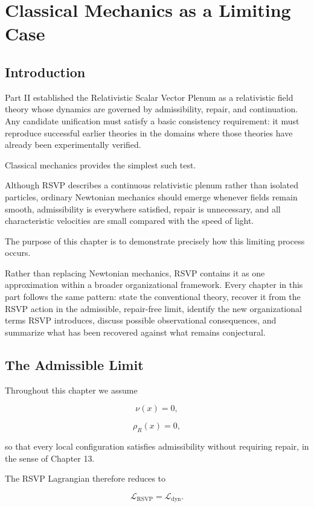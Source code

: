 \documentclass[11pt,oneside]{book}
\numberwithin{equation}{chapter}
\theoremstyle{definition}
\theoremstyle{plain}
\begin{document}
\chapter{Classical Mechanics as a Limiting Case}

\section{Introduction}

Part II established the Relativistic Scalar Vector Plenum as a relativistic
field theory whose dynamics are governed by admissibility, repair, and
continuation. Any candidate unification must satisfy a basic consistency
requirement: it must reproduce successful earlier theories in the domains
where those theories have already been experimentally verified.

Classical mechanics provides the simplest such test.

Although RSVP describes a continuous relativistic plenum rather than
isolated particles, ordinary Newtonian mechanics should emerge whenever
fields remain smooth, admissibility is everywhere satisfied, repair is
unnecessary, and all characteristic velocities are small compared with the
speed of light.

The purpose of this chapter is to demonstrate precisely how this limiting
process occurs.

Rather than replacing Newtonian mechanics, RSVP contains it as one
approximation within a broader organizational framework. Every chapter in
this part follows the same pattern: state the conventional theory, recover
it from the RSVP action in the admissible, repair-free limit, identify the
new organizational terms RSVP introduces, discuss possible observational
consequences, and summarize what has been recovered against what remains
conjectural.

\section{The Admissible Limit}

Throughout this chapter we assume

\[
\nu(x)=0,
\]

\[
\rho_R(x)=0,
\]

so that every local configuration satisfies admissibility without requiring
repair, in the sense of Chapter 13.

The RSVP Lagrangian therefore reduces to

\[
\mathcal L_{\mathrm{RSVP}}
=
\mathcal L_{\mathrm{dyn}}.
\]
\end{document}
